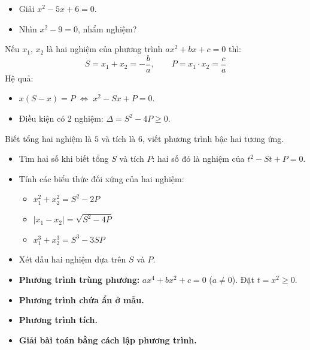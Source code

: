 \documentclass[12pt,a4paper]{article}
\begin{document}
\begin{vidu}
  \begin{itemize}
    \item Giải $x^2 - 5x + 6 = 0$.
    \item Nhìn $x^2 - 9 = 0$, nhẩm nghiệm?
  \end{itemize}
\end{vidu}

\begin{dinhly}[title={Định lý Vi-ét}]
  Nếu $x_1,\, x_2$ là hai nghiệm của phương trình $ax^2 + bx + c = 0$ thì:
  \[S = x_1 + x_2 = -\frac{b}{a}, \qquad P = x_1 \cdot x_2 = \frac{c}{a}\]
  Hệ quả:
  \begin{itemize}
    \item $x(S - x) = P \;\Leftrightarrow\; x^2 - Sx + P = 0$.
    \item Điều kiện có 2 nghiệm: $\Delta = S^2 - 4P \ge 0$.
  \end{itemize}
\end{dinhly}

\begin{vidu}
  Biết tổng hai nghiệm là $5$ và tích là $6$, viết phương trình bậc hai tương ứng.
\end{vidu}

\begin{phuongphap}[title={Ứng dụng định lý Vi-ét}]
  \begin{itemize}
    \item Tìm hai số khi biết tổng $S$ và tích $P$: hai số đó là nghiệm của $t^2 - St + P = 0$.
    \item Tính các biểu thức đối xứng của hai nghiệm:
      \begin{itemize}
        \item $x_1^2 + x_2^2 = S^2 - 2P$
        \item $|x_1 - x_2| = \sqrt{S^2 - 4P}$
        \item $x_1^3 + x_2^3 = S^3 - 3SP$
      \end{itemize}
    \item Xét dấu hai nghiệm dựa trên $S$ và $P$.
  \end{itemize}
\end{phuongphap}

\begin{phuongphap}[title={Các dạng phương trình đặc biệt}]
  \begin{itemize}
    \item \textbf{Phương trình trùng phương:} $ax^4 + bx^2 + c = 0$ \quad ($a \neq 0$). Đặt $t = x^2 \ge 0$.
    \item \textbf{Phương trình chứa ẩn ở mẫu.}
    \item \textbf{Phương trình tích.}
    \item \textbf{Giải bài toán bằng cách lập phương trình.}
  \end{itemize}
\end{phuongphap}
\end{document}
